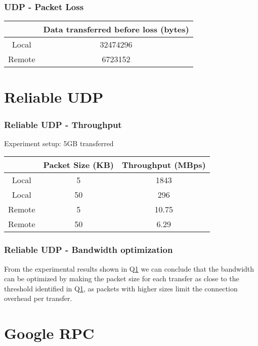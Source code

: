 \documentclass[a4paper]{article}
\begin{document}
\section{UDP - Packet Loss} \label{udp_packet_loss}
\begin{center}
	\begin{tabular}{ |c|c| } 
		\hline
		& Data transferred before loss (bytes) \\ 
		\hline
		\hline
		Local & 32474296 \\ 
		\hline
		Remote & 6723152 \\ 
		\hline
	\end{tabular}
\end{center}

\part{Reliable UDP}

\section{Reliable UDP - Throughput} \label{reliable_udp_throughput}
Experiment setup: 5GB transferred
\begin{center}
	\begin{tabular}{ |c|c|c| } 
		\hline
		& Packet Size (KB) & Throughput (MBps) \\ 
		\hline
		\hline
		Local & 5 & 1843 \\ 
		\hline
		Local & 50 & 296 \\ 
		\hline
		Remote & 5 & 10.75 \\ 
		\hline
		Remote & 50 & 6.29 \\ 
		\hline
	\end{tabular}
\end{center}

\section{Reliable UDP - Bandwidth optimization}
From the experimental results shown in Q\ref{reliable_udp_throughput} we can conclude that the bandwidth can be optimized by making the packet size for each transfer as close to the threshold identified in Q\ref{udp_packet_loss}, as packets with higher sizes limit the connection overhead per transfer.

\part{Google RPC}
\end{document}
